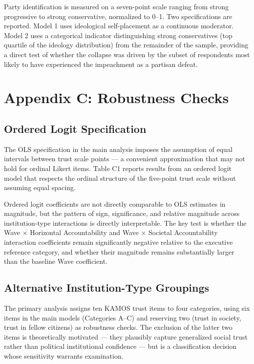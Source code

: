 \documentclass[
  12pt,
  letterpaper]{article}
\begin{document}
Party identification is measured on a seven-point scale ranging from
strong progressive to strong conservative, normalized to 0--1. Two
specifications are reported. Model 1 uses ideological self-placement as
a continuous moderator. Model 2 uses a categorical indicator
distinguishing strong conservatives (top quartile of the ideology
distribution) from the remainder of the sample, providing a direct test
of whether the collapse was driven by the subset of respondents most
likely to have experienced the impeachment as a partisan defeat.

\section{Appendix C: Robustness Checks}\label{sec-robustness}

\subsection{Ordered Logit Specification}\label{sec-ologit}

The OLS specification in the main analysis imposes the assumption of
equal intervals between trust scale points --- a convenient
approximation that may not hold for ordinal Likert items. Table C1
reports results from an ordered logit model that respects the ordinal
structure of the five-point trust scale without assuming equal spacing.

Ordered logit coefficients are not directly comparable to OLS estimates
in magnitude, but the pattern of sign, significance, and relative
magnitude across institution-type interactions is directly
interpretable. The key test is whether the Wave × Horizontal
Accountability and Wave × Societal Accountability interaction
coefficients remain significantly negative relative to the executive
reference category, and whether their magnitude remains substantially
larger than the baseline Wave coefficient.

\subsection{Alternative Institution-Type
Groupings}\label{sec-alt-groupings}

The primary analysis assigns ten KAMOS trust items to four categories,
using six items in the main models (Categories A--C) and reserving two
(trust in society, trust in fellow citizens) as robustness checks. The
exclusion of the latter two items is theoretically motivated --- they
plausibly capture generalized social trust rather than political
institutional confidence --- but is a classification decision whose
sensitivity warrants examination.
\end{document}
